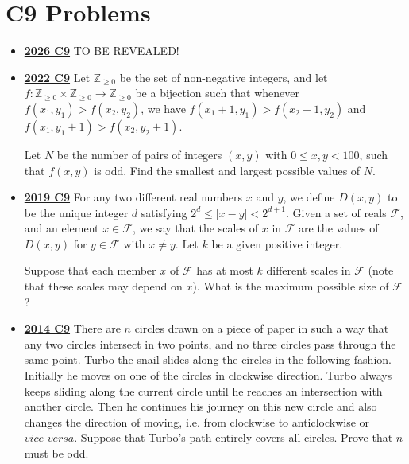 \documentclass[11pt]{scrartcl}
\begin{document}
\section*{C9 Problems} \label{C9}
\begin{itemize}[leftmargin=*]


\item \href{https://www.imo-official.org/assets/documents/problems/2026/IMO2026SL.pdf}{\textbf{2026 C9}} TO BE REVEALED!

 
    \item \href{https://artofproblemsolving.com/community/c6h3107328p28104256}{\textbf{2022 C9}} Let $\mathbb Z_{\geqslant 0}$ be the set of non-negative integers, and let $f:\mathbb Z_{\geqslant 0}\times \mathbb Z_{\geqslant 0} \to \mathbb Z_{\geqslant 0}$ be a bijection such that whenever $f(x_1,y_1) > f(x_2, y_2)$, we have $f(x_1+1, y_1) > f(x_2 + 1, y_2)$ and $f(x_1, y_1+1) > f(x_2, y_2+1)$.

Let $N$ be the number of pairs of integers $(x,y)$ with $0\leqslant x,y<100$, such that $f(x,y)$ is odd. Find the smallest and largest possible values of $N$.
    \item \href{https://artofproblemsolving.com/community/c6h2279019p17828982}{\textbf{2019 C9}}  For any two different real numbers $x$ and $y$, we define $D(x,y)$ to be the unique integer $d$ satisfying $2^d\leqslant |x-y| < 2^{d+1}$. Given a set of reals $\mathcal F$, and an element $x\in \mathcal F$, we say that the scales of $x$ in $\mathcal F$ are the values of $D(x,y)$ for $y\in\mathcal F$ with $x\neq y$. Let $k$ be a given positive integer.

Suppose that each member $x$ of $\mathcal F$ has at most $k$ different scales in $\mathcal F$ (note that these scales may depend on $x$). What is the maximum possible size of $\mathcal F$?
    \item \href{https://artofproblemsolving.com/community/c6h1113189p5083556}{\textbf{2014 C9}} There are $n$ circles drawn on a piece of paper in such a way that any two circles intersect in two points, and no three circles pass through the same point. Turbo the snail slides along the circles in the following fashion. Initially he moves on one of the circles in clockwise direction. Turbo always keeps sliding along the current circle until he reaches an intersection with another circle. Then he continues his journey on this new circle and also changes the direction of moving, i.e. from clockwise to anticlockwise or $\textit{vice versa}$.
Suppose that Turbo's path entirely covers all circles. Prove that $n$ must be odd.
\end{itemize}
\newpage
\end{document}

